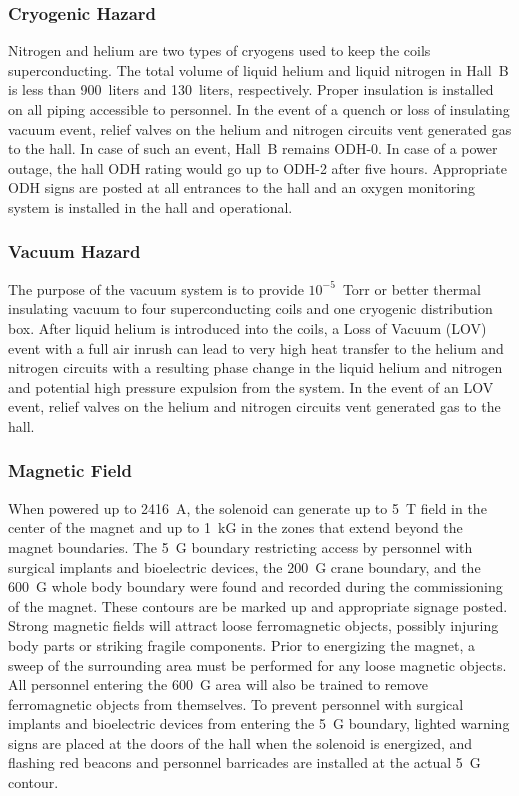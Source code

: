 \subsubsection{Cryogenic Hazard}

Nitrogen and helium are two types of cryogens used to keep the coils superconducting. The 
total volume of liquid helium and liquid nitrogen in Hall~B is less than 900~liters and 
130~liters, respectively. Proper insulation is installed on all piping accessible to 
personnel. In the event of a quench or loss of insulating vacuum event, relief valves on 
the helium and nitrogen circuits vent generated gas to the hall. In case of such an event, 
Hall~B remains ODH-0. In case of a power outage, the hall ODH rating would go up to ODH-2 
after five hours. Appropriate ODH signs are posted at all entrances to the hall and an 
oxygen monitoring system is installed in the hall and operational.

\subsubsection{Vacuum Hazard}

The purpose of the vacuum system is to provide $10^{-5}$~Torr or better thermal insulating 
vacuum to four superconducting coils and one cryogenic distribution box. After liquid helium 
is introduced into the coils, a Loss of Vacuum (LOV) event with a full air inrush can lead to
very high heat transfer to the helium and nitrogen circuits with a resulting phase change in 
the liquid helium and nitrogen and potential high pressure expulsion from the system. In the 
event of an LOV event, relief valves on the helium and nitrogen circuits vent generated
gas to the hall.

\subsubsection{Magnetic Field}

When powered up to 2416~A, the solenoid can generate up to 5~T field in the center of the 
magnet and up to 1~kG in the zones that extend beyond the magnet boundaries. The 5~G 
boundary restricting access by personnel with surgical implants and bioelectric devices, 
the 200~G crane boundary, and the 600~G whole body boundary were found and recorded during 
the commissioning of the magnet. These contours are be marked up and appropriate signage 
posted. Strong magnetic fields will attract loose ferromagnetic objects, possibly injuring 
body parts or striking fragile components. Prior to energizing the magnet, a sweep of the
surrounding area must be performed for any loose magnetic objects. All personnel entering 
the 600~G area will also be trained to remove ferromagnetic objects from themselves. To 
prevent personnel with surgical implants and bioelectric devices from entering the 5~G
boundary, lighted warning signs are placed at the doors of the hall when the solenoid is 
energized, and flashing red beacons and personnel barricades are installed at the actual 5~G 
contour.


